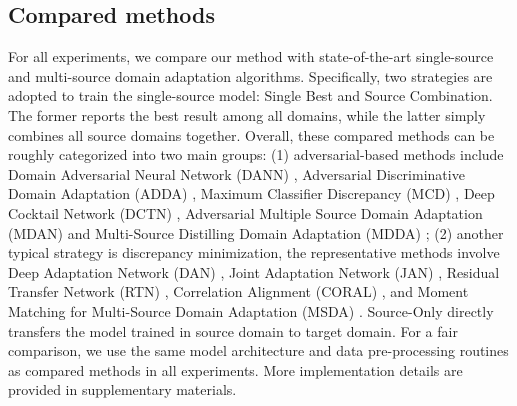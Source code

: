 \documentclass[10pt,twocolumn,letterpaper]{article}
\begin{document}
\subsection{Compared methods}
For all experiments, we compare our method with state-of-the-art single-source and multi-source domain adaptation algorithms. Specifically, two strategies are adopted to train the single-source model: Single Best and Source Combination. The former reports the best result among all domains, while the latter simply combines all source domains together. Overall, these compared methods can be roughly categorized into two main groups: (1) adversarial-based methods include Domain Adversarial Neural Network (DANN) \cite{ganin2016domain}, Adversarial Discriminative Domain Adaptation (ADDA) \cite{tzeng2017adversarial}, Maximum Classifier Discrepancy (MCD) \cite{saito2018maximum}, Deep Cocktail Network (DCTN) \cite{xu2018deep}, Adversarial Multiple Source Domain Adaptation (MDAN) \cite{zhao2018adversarial} and Multi-Source Distilling Domain Adaptation (MDDA) \cite{zhao2020multi}; (2) another typical strategy is discrepancy minimization, the representative methods involve Deep Adaptation Network (DAN) \cite{long2015learning}, Joint Adaptation Network (JAN) \cite{long2017deep}, Residual Transfer Network (RTN) \cite{long2016unsupervised}, Correlation Alignment (CORAL) \cite{sun2017correlation}, and Moment Matching for Multi-Source Domain Adaptation (MSDA) \cite{peng2019moment}. Source-Only directly transfers the model trained in source domain to target domain. For a fair comparison, we use the same model architecture and data pre-processing routines as compared methods in all experiments. More implementation details are provided in supplementary materials.
\end{document}
